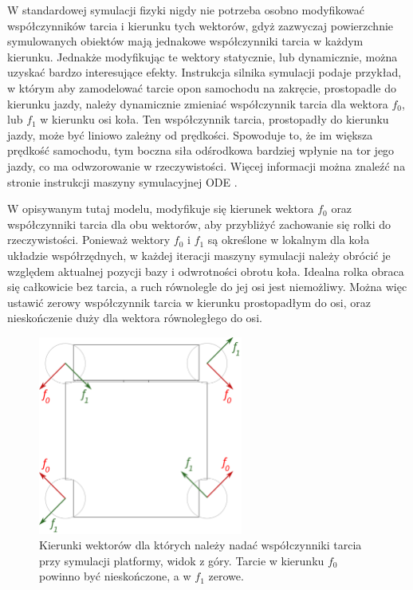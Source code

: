 		W standardowej symulacji fizyki nigdy nie potrzeba osobno modyfikować współczynników tarcia i kierunku tych wektorów, 
		gdyż zazwyczaj powierzchnie symulowanych obiektów mają jednakowe współczynniki tarcia w każdym kierunku.
		Jednakże modyfikując te wektory statycznie, lub dynamicznie, można uzyskać bardzo interesujące efekty.
		Instrukcja silnika symulacji podaje przykład, w którym aby zamodelować tarcie opon samochodu na zakręcie, prostopadle do kierunku jazdy, 
		należy dynamicznie zmieniać współczynnik tarcia dla wektora $f_0$, lub $f_1$ w kierunku osi koła.
		Ten współczynnik tarcia, prostopadły do kierunku jazdy, może być liniowo zależny od prędkości.
		Spowoduje to, że im większa prędkość samochodu, tym boczna siła odśrodkowa bardziej wpłynie na tor jego jazdy, co ma odwzorowanie w rzeczywistości.
		Więcej informacji można znaleźć na stronie instrukcji maszyny symulacyjnej ODE \cite{ode_contact}.

		W opisywanym tutaj modelu, modyfikuje się kierunek wektora $f_0$ oraz współczynniki tarcia dla obu wektorów, aby przybliżyć zachowanie się rolki do rzeczywistości.
		Ponieważ wektory $f_0$ i $f_1$ są określone w lokalnym dla koła układzie współrzędnych, 
		w każdej iteracji maszyny symulacji należy obrócić je względem aktualnej pozycji bazy i odwrotności obrotu koła.
		Idealna rolka obraca się całkowicie bez tarcia, a ruch równolegle do jej osi jest niemożliwy.
		Można więc ustawić zerowy współczynnik tarcia w kierunku prostopadłym do osi, oraz nieskończenie duży dla wektora równoległego do osi.

		\begin{figure}[h]
		\centering
		\includegraphics[width=0.6\textwidth]{graphics/base_vects.pdf}
		\caption{Kierunki wektorów dla których należy nadać współczynniki tarcia przy symulacji platformy, widok z góry. Tarcie w kierunku $f_0$ powinno być nieskończone, a w $f_1$ zerowe.}
		\end{figure} 

